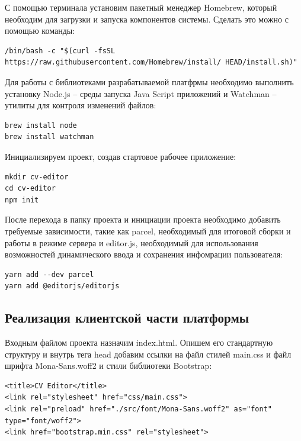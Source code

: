 \documentclass[master, och, coursework]{SCWorks}
\begin{document}
С помощью терминала установим пакетный менеджер Homebrew, который необходим 
для загрузки и запуска компонентов системы. Сделать это можно с помощью команды:

\begin{verbatim}
/bin/bash -c "$(curl -fsSL https://raw.githubusercontent.com/Homebrew/install/ HEAD/install.sh)"
\end{verbatim}

Для работы с библиотеками разрабатываемой платфрмы необходимо выполнить установку Node.js – 
среды запуска Java Script приложений и Watchman – утилиты для контроля изменений файлов:

\begin{verbatim}
brew install node
brew install watchman
\end{verbatim}


Инициализируем проект, создав стартовое рабочее приложение:

\begin{verbatim}
mkdir cv-editor
cd cv-editor
npm init
\end{verbatim}


После перехода в папку проекта и инициации проекта необходимо добавить
требуемые зависимости, такие как parcel, необходимый для итоговой сборки и 
работы в режиме сервера и editor.js, необходимый для использования 
возможностей динамического ввода и сохранения инфомрации пользователя:
\begin{verbatim}
yarn add --dev parcel
yarn add @editorjs/editorjs
\end{verbatim}


\subsection{Реализация клиентской части платформы}
Входным файлом проекта назначим index.html. Опишем его стандартную структуру и 
внутрь тега head добавим ссылки на файл стилей main.css и файл шрифта Mona-Sans.woff2 и
стили библиотеки Bootstrap:
\begin{verbatim}
<title>CV Editor</title>
<link rel="stylesheet" href="css/main.css">
<link rel="preload" href="./src/font/Mona-Sans.woff2" as="font" type="font/woff2">
<link href="bootstrap.min.css" rel="stylesheet">
\end{verbatim}
\end{document}
